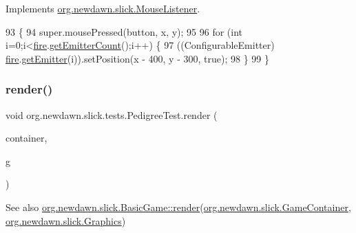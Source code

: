 Implements \mbox{\hyperlink{interfaceorg_1_1newdawn_1_1slick_1_1_mouse_listener_aeca4c21a38aa31c408f3daf6f86c0925}{org.\+newdawn.\+slick.\+Mouse\+Listener}}.


\begin{DoxyCode}
93                                                        \{
94         super.mousePressed(button, x, y);
95         
96         \textcolor{keywordflow}{for} (\textcolor{keywordtype}{int} i=0;i<\mbox{\hyperlink{classorg_1_1newdawn_1_1slick_1_1tests_1_1_pedigree_test_a357e9f5bc41de79c98bb219355467638}{fire}}.\mbox{\hyperlink{classorg_1_1newdawn_1_1slick_1_1particles_1_1_particle_system_a3103b9ed9a7b4a1f3316a94233092966}{getEmitterCount}}();i++) \{
97             ((ConfigurableEmitter) \mbox{\hyperlink{classorg_1_1newdawn_1_1slick_1_1tests_1_1_pedigree_test_a357e9f5bc41de79c98bb219355467638}{fire}}.\mbox{\hyperlink{classorg_1_1newdawn_1_1slick_1_1particles_1_1_particle_system_a97e9702f67b46027303ab8e04bf120d3}{getEmitter}}(i)).setPosition(x - 400, y - 300, \textcolor{keyword}{true});
98         \}
99     \}
\end{DoxyCode}
\mbox{\label{classorg_1_1newdawn_1_1slick_1_1tests_1_1_pedigree_test_a8b1fd76eb8e541e612450649ececfebd}} 
\subsubsection{\texorpdfstring{render()}{render()}}
{\footnotesize\ttfamily void org.\+newdawn.\+slick.\+tests.\+Pedigree\+Test.\+render (\begin{DoxyParamCaption}\item[{\mbox{\hyperlink{classorg_1_1newdawn_1_1slick_1_1_game_container}{Game\+Container}}}]{container,  }\item[{\mbox{\hyperlink{classorg_1_1newdawn_1_1slick_1_1_graphics}{Graphics}}}]{g }\end{DoxyParamCaption})\hspace{0.3cm}{\ttfamily [inline]}}

\begin{DoxySeeAlso}{See also}
\mbox{\hyperlink{interfaceorg_1_1newdawn_1_1slick_1_1_game_af1a4670d43eb3ba04dfcf55ab1975b64}{org.\+newdawn.\+slick.\+Basic\+Game\+::render}}(\mbox{\hyperlink{classorg_1_1newdawn_1_1slick_1_1_game_container}{org.\+newdawn.\+slick.\+Game\+Container}}, \mbox{\hyperlink{classorg_1_1newdawn_1_1slick_1_1_graphics}{org.\+newdawn.\+slick.\+Graphics}}) 
\end{DoxySeeAlso}



